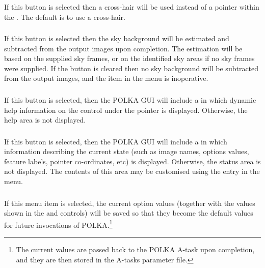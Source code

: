 \subsubsection {}
If this button is selected then a cross-hair will be used instead of a
pointer within the .
The default is to use a cross-hair.

\subsubsection {}
If this button is selected then the sky background will be estimated and
subtracted from the output images upon completion. The estimation will be
based on the supplied sky frames, or on the identified sky areas if no
sky frames were supplied. If the button is cleared then no sky background
will be subtracted from the output images, and the
 item in the
 menu is inoperative.

\subsubsection {} 
If this button is selected, then the POLKA GUI will include a
 in which dynamic help information
on the control under the pointer is displayed. Otherwise, the help area
is not displayed.

\subsubsection {} 
If this button is selected, then the POLKA GUI will include a
 in which information
describing the current state (such as image names, options values, 
feature labels, pointer co-ordinates, etc) is displayed. Otherwise, the
status area is not displayed. The contents of this area may be customised
using the  entry in the
 menu.

\subsubsection {} 
If this menu item is selected, the current option values (together with
the values shown in the 
and  controls) will be saved so that
they become the default values for future invocations of
POLKA.\footnote{The current values are passed back to the POLKA A-task 
upon completion, and they are then stored in the A-tasks parameter file.}

